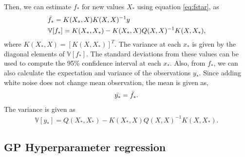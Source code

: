 \documentclass[conference]{IEEEtran}
\begin{document}
Then, we can estimate $f_*$ for new values $X_*$ using equation \ref{eq:fstar}, as
\begin{equation}
\begin{aligned}
    &\Bar{f_*} = K(X_*,X)K(X,X)^{-1}y\\
    &\mathbb{V}[f_*] = K(X_*,X_*) - K(X_*,X)Q(X,X)^{-1}K(X,X_*),
\end{aligned}
\end{equation}
where $K(X_*,X) = \left[K(X,X_*)\right]^T$.
The variance at each $x_*$ is given by the diagonal elements of $\mathbb{V}[f_*]$. 
The standard deviations from these values can be used to compute the 95\% confidence interval at each $x_*$.
Also, from $f_*$, we can also calculate the expectation and variance of the observations $y_*$. Since adding white noise does not change mean observation, the mean is given as,
\begin{equation}
\begin{aligned}
    \Bar{y_*} = \Bar{f_*}.
\end{aligned}
\end{equation}
The variance is given as
\begin{equation}
\begin{aligned}
	\mathbb{V}[y_*] = Q(X_*,X_*) - K(X_*,X)Q(X,X)^{-1}K(X,X_*).
\end{aligned}
\end{equation}


\subsection{GP Hyperparameter regression}
\end{document}
